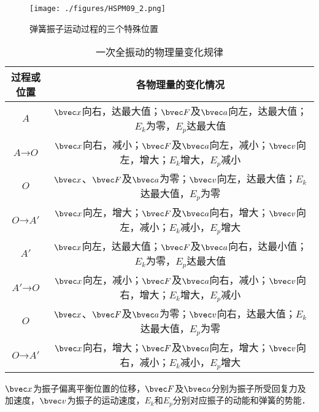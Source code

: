 \begin{figure}[ht]
\centering
\texttt{[image: ./figures/HSPM09\_2.png]}
\caption{弹簧振子运动过程的三个特殊位置} \label{HSPM09_fig2}
\end{figure}

\begin{table}[ht]
\centering
\caption{一次全振动的物理量变化规律}\label{HSPM09_tab1}
\begin{tabular}{|c|c|}
\hline
过程或位置 & 各物理量的变化情况 \\
\hline
$A$ & $\bvec x$向右，达最大值；$\bvec F$及$\bvec a$向左，达最大值；$E_k$为零，$E_p$达最大值 \\
\hline
$A$→$O$ & $\bvec x$向右，减小；$\bvec F$及$\bvec a$向左，减小；$\bvec v$向左，增大；$E_k$增大，$E_p$减小 \\
\hline
$O$ & $\bvec x$、$\bvec F$及$\bvec a$为零；$\bvec v$向左，达最大值；$E_k$达最大值，$E_p$为零 \\
\hline
$O$→$A'$ & $\bvec x$向左，增大；$\bvec F$及$\bvec a$向右，增大；$\bvec v$向左，减小；$E_k$减小，$E_p$增大 \\
\hline
$A'$ & $\bvec x$向左，达最大值；$\bvec F$及$\bvec a$向右，达最小值；$E_k$为零，$E_p$达最大值 \\
\hline
$A'$→$O$ & $\bvec x$向左，减小；$\bvec F$及$\bvec a$向右，减小；$\bvec v$向右，增大；$E_k$增大，$E_p$减小 \\
\hline
$O$ & $\bvec x$、$\bvec F$及$\bvec a$为零；$\bvec v$向右，达最大值；$E_k$达最大值，$E_p$为零 \\
\hline
$O$→$A'$ & $\bvec x$向右，增大；$\bvec F$及$\bvec a$向左，增大；$\bvec v$向右，减小；$E_k$减小，$E_p$增大 \\
\hline
\end{tabular}
\end{table}
$\bvec x$为振子偏离平衡位置的位移，$\bvec F$及$\bvec a$分别为振子所受回复力及加速度，$\bvec v$为振子的运动速度，$E_k$和$E_p$分别对应振子的动能和弹簧的势能．